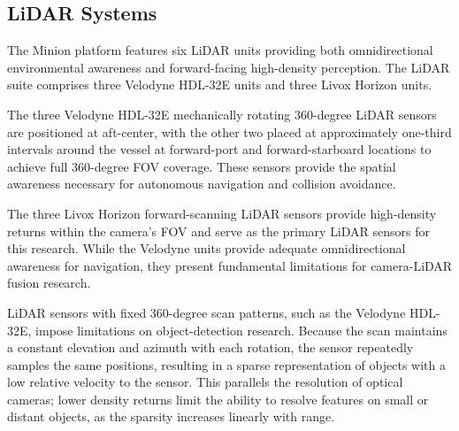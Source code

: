 \documentclass{erauthesis}
\begin{document}

\subsection{LiDAR Systems} \label{sensors_LiDAR}

The Minion platform features six \ac{LiDAR} units providing both omnidirectional environmental awareness and forward-facing high-density perception.
The \ac{LiDAR} suite comprises three Velodyne HDL-32E units and three Livox Horizon units.

The three Velodyne HDL-32E mechanically rotating 360-degree \ac{LiDAR} sensors are positioned at aft-center, with the other two placed at approximately one-third intervals around the vessel at forward-port and forward-starboard locations to achieve full 360-degree \ac{FOV} coverage.
These sensors provide the spatial awareness necessary for autonomous navigation and collision avoidance.

The three Livox Horizon forward-scanning \ac{LiDAR} sensors provide high-density returns within the camera's \ac{FOV} and serve as the primary \ac{LiDAR} sensors for this research.
While the Velodyne units provide adequate omnidirectional awareness for navigation, they present fundamental limitations for camera-\ac{LiDAR} fusion research.

LiDAR sensors with fixed 360-degree scan patterns, such as the Velodyne HDL-32E, impose limitations on object-detection research.
Because the scan maintains a constant elevation and azimuth with each rotation, the sensor repeatedly samples the same positions, resulting in a sparse representation of objects with a low relative velocity to the sensor.
This parallels the resolution of optical cameras; lower density returns limit the ability to resolve features on small or distant objects, as the sparsity increases linearly with range.
\end{document}
